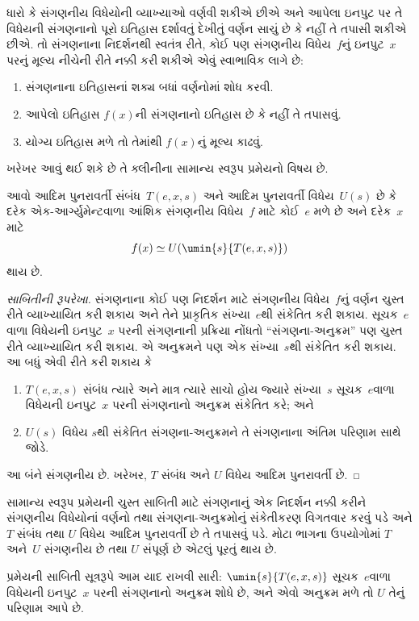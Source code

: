 \documentclass[../../../include/open-logic-section]{subfiles}
\begin{document}

ધારો કે સંગણનીય વિધેયોની વ્યાખ્યાઓ વર્ણવી શકીએ છીએ અને આપેલા
ઇનપુટ પર તે વિધેયની સંગણનાનો પૂરો ઇતિહાસ દર્શાવતું દેખીતું
વર્ણન સાચું છે કે નહીં તે તપાસી શકીએ છીએ. તો સંગણનાના નિદર્શનથી
સ્વતંત્ર રીતે, કોઈ પણ સંગણનીય વિધેય~$f$નું ઇનપુટ~$x$ પરનું
મૂલ્ય નીચેની રીતે નક્કી કરી શકીએ એવું સ્વાભાવિક લાગે છે:
\begin{enumerate}
  \item સંગણનાના ઇતિહાસનાં શક્ય બધાં વર્ણનોમાં શોધ કરવી.
  \item આપેલો ઇતિહાસ $f(x)$ની સંગણનાનો ઇતિહાસ છે કે નહીં તે તપાસવું.
  \item યોગ્ય ઇતિહાસ મળે તો તેમાંથી $f(x)$નું મૂલ્ય કાઢવું.
\end{enumerate}
ખરેખર આવું થઈ શકે છે તે ક્લીનીના સામાન્ય સ્વરૂપ પ્રમેયનો વિષય છે.

\begin{thm}[ક્લીનીનું સામાન્ય સ્વરૂપ પ્રમેય]
આવો આદિમ પુનરાવર્તી સંબંધ~$T(e,x,s)$ અને આદિમ પુનરાવર્તી
વિધેય~$U(s)$ છે કે દરેક એક-આર્ગ્યુમેન્ટવાળા આંશિક સંગણનીય
વિધેય~$f$ માટે કોઈ~$e$ મળે છે અને દરેક~$x$ માટે
\[
f(x) \simeq U(\umin{s}{T(e,x,s)})
\]
થાય છે.
\end{thm}

\begin{proof}[સાબિતીની રૂપરેખા]
સંગણનાના કોઈ પણ નિદર્શન માટે સંગણનીય વિધેય~$f$નું વર્ણન ચુસ્ત રીતે
વ્યાખ્યાયિત કરી શકાય અને તેને પ્રાકૃતિક સંખ્યા~$e$થી સંકેતિત કરી
શકાય. સૂચક~$e$વાળા વિધેયની ઇનપુટ~$x$ પરની સંગણનાની પ્રક્રિયા
નોંધતો ``સંગણના-અનુક્રમ'' પણ ચુસ્ત રીતે વ્યાખ્યાયિત કરી શકાય. એ
અનુક્રમને પણ એક સંખ્યા~$s$થી સંકેતિત કરી શકાય. આ બધું એવી રીતે
કરી શકાય કે
\begin{enumerate}
  \item $T(e,x,s)$ સંબંધ ત્યારે અને માત્ર ત્યારે સાચો હોય જ્યારે
  સંખ્યા~$s$ સૂચક~$e$વાળા વિધેયની ઇનપુટ~$x$ પરની સંગણનાનો
  અનુક્રમ સંકેતિત કરે; અને
  \item $U(s)$ વિધેય $s$થી સંકેતિત સંગણના-અનુક્રમને તે
  સંગણનાના અંતિમ પરિણામ સાથે જોડે.
\end{enumerate}
આ બંને સંગણનીય છે. ખરેખર, $T$ સંબંધ અને $U$ વિધેય આદિમ
પુનરાવર્તી છે.
\end{proof}

\begin{explain}
સામાન્ય સ્વરૂપ પ્રમેયની ચુસ્ત સાબિતી માટે સંગણનાનું એક નિદર્શન
નક્કી કરીને સંગણનીય વિધેયોનાં વર્ણનો તથા સંગણના-અનુક્રમોનું
સંકેતીકરણ વિગતવાર કરવું પડે અને $T$ સંબંધ તથા $U$ વિધેય
આદિમ પુનરાવર્તી છે તે તપાસવું પડે. મોટા ભાગના ઉપયોગોમાં $T$
અને~$U$ સંગણનીય છે તથા $U$ સંપૂર્ણ છે એટલું પૂરતું થાય છે.

પ્રમેયની સાબિતી સૂત્રરૂપે આમ યાદ રાખવી સારી: $\umin{s}{T(e,x,s)}$
સૂચક~$e$વાળા વિધેયની ઇનપુટ~$x$ પરની સંગણનાનો અનુક્રમ શોધે છે,
અને એવો અનુક્રમ મળે તો $U$ તેનું પરિણામ આપે છે.
\end{explain}
\end{document}
